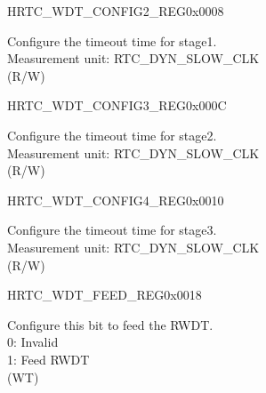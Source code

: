 \begin{register}{H}{RTC\_WDT\_CONFIG2\_REG}{0x0008}\label{regdesc:RTCWDTCONFIG2REG}
%
\regnewline%
\begin{regdesc}\begin{reglist}
\label{fielddesc:RTCWDTSTG1HOLD}\item [RTC\_WDT\_STG1\_HOLD] Configure the timeout time for stage1.\\
Measurement unit: RTC\_DYN\_SLOW\_CLK  \\ (R/W)
\end{reglist}\end{regdesc}
\end{register}


\begin{register}{H}{RTC\_WDT\_CONFIG3\_REG}{0x000C}\label{regdesc:RTCWDTCONFIG3REG}
%
\regnewline%
\begin{regdesc}\begin{reglist}
\label{fielddesc:RTCWDTSTG2HOLD}\item [RTC\_WDT\_STG2\_HOLD] Configure the timeout time for stage2.\\
Measurement unit: RTC\_DYN\_SLOW\_CLK  \\ (R/W)
\end{reglist}\end{regdesc}
\end{register}


\begin{register}{H}{RTC\_WDT\_CONFIG4\_REG}{0x0010}\label{regdesc:RTCWDTCONFIG4REG}
%
\regnewline%
\begin{regdesc}\begin{reglist}
\label{fielddesc:RTCWDTSTG3HOLD}\item [RTC\_WDT\_STG3\_HOLD] Configure the timeout time for stage3.\\
Measurement unit: RTC\_DYN\_SLOW\_CLK  \\ (R/W)
\end{reglist}\end{regdesc}
\end{register}


\begin{register}{H}{RTC\_WDT\_FEED\_REG}{0x0018}\label{regdesc:RTCWDTFEEDREG}
%
%
\regnewline%
\begin{regdesc}\begin{reglist}
\label{fielddesc:RTCWDTRTCWDTFEED}\item [RTC\_WDT\_RTC\_WDT\_FEED] Configure this bit to feed the RWDT.\\
0: Invalid \\
1: Feed RWDT  \\ (WT)
\end{reglist}\end{regdesc}
\end{register}


